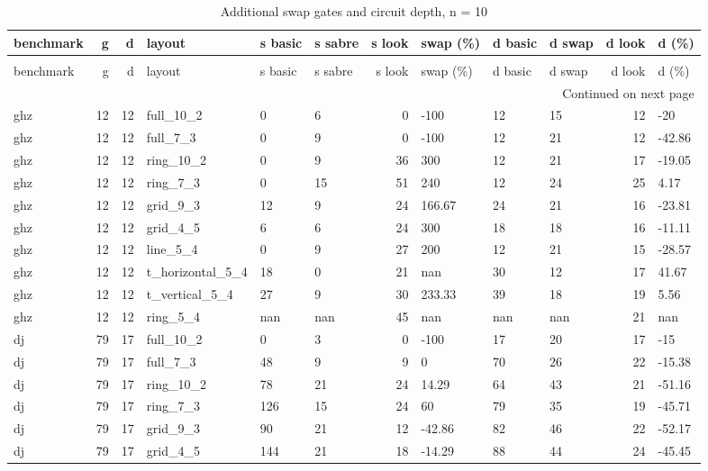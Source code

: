 \begin{longtable}{lrrlllrlllrl}
\caption{Additional swap gates and circuit depth, n = 10} \label{benchmark-table-10} \\
\toprule
benchmark & g & d & layout & s basic & s sabre & s look & swap (\%) & d basic & d swap & d look & d (\%) \\
\midrule
\endfirsthead
\caption[]{Additional swap gates and circuit depth, n = 10} \\
\toprule
benchmark & g & d & layout & s basic & s sabre & s look & swap (\%) & d basic & d swap & d look & d (\%) \\
\midrule
\endhead
\midrule
\multicolumn{12}{r}{Continued on next page} \\
\midrule
\endfoot
\bottomrule
\endlastfoot
ghz & 12 & 12 & full\_10\_2 & 0 & 6 & 0 & -100 & 12 & 15 & 12 & -20 \\
ghz & 12 & 12 & full\_7\_3 & 0 & 9 & 0 & -100 & 12 & 21 & 12 & -42.86 \\
ghz & 12 & 12 & ring\_10\_2 & 0 & 9 & 36 & 300 & 12 & 21 & 17 & -19.05 \\
ghz & 12 & 12 & ring\_7\_3 & 0 & 15 & 51 & 240 & 12 & 24 & 25 & 4.17 \\
ghz & 12 & 12 & grid\_9\_3 & 12 & 9 & 24 & 166.67 & 24 & 21 & 16 & -23.81 \\
ghz & 12 & 12 & grid\_4\_5 & 6 & 6 & 24 & 300 & 18 & 18 & 16 & -11.11 \\
ghz & 12 & 12 & line\_5\_4 & 0 & 9 & 27 & 200 & 12 & 21 & 15 & -28.57 \\
ghz & 12 & 12 & t\_horizontal\_5\_4 & 18 & 0 & 21 & nan & 30 & 12 & 17 & 41.67 \\
ghz & 12 & 12 & t\_vertical\_5\_4 & 27 & 9 & 30 & 233.33 & 39 & 18 & 19 & 5.56 \\
ghz & 12 & 12 & ring\_5\_4 & nan & nan & 45 & nan & nan & nan & 21 & nan \\
dj & 79 & 17 & full\_10\_2 & 0 & 3 & 0 & -100 & 17 & 20 & 17 & -15 \\
dj & 79 & 17 & full\_7\_3 & 48 & 9 & 9 & 0 & 70 & 26 & 22 & -15.38 \\
dj & 79 & 17 & ring\_10\_2 & 78 & 21 & 24 & 14.29 & 64 & 43 & 21 & -51.16 \\
dj & 79 & 17 & ring\_7\_3 & 126 & 15 & 24 & 60 & 79 & 35 & 19 & -45.71 \\
dj & 79 & 17 & grid\_9\_3 & 90 & 21 & 12 & -42.86 & 82 & 46 & 22 & -52.17 \\
dj & 79 & 17 & grid\_4\_5 & 144 & 21 & 18 & -14.29 & 88 & 44 & 24 & -45.45 \\

\end{longtable}
